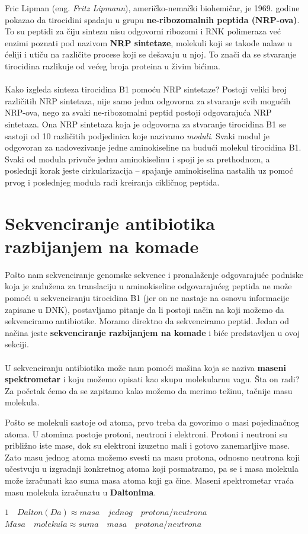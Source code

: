 Fric Lipman (eng. \textit{Fritz Lipmann}), američko-nemački biohemičar, je 1969. godine  pokazao da tirocidini spadaju u grupu \textbf{ne-ribozomalnih peptida (NRP-ova)}. To su peptidi za čiju sintezu nisu odgovorni ribozomi i RNK polimeraza već enzimi poznati pod nazivom \textbf{NRP sintetaze}, molekuli koji se takođe nalaze u ćeliji i utiču na različite procese koji se dešavaju u njoj. To znači da se stvaranje tirocidina razlikuje od većeg broja proteina u živim bićima. 
\\\\
\indent Kako izgleda sinteza tirocidina B1 pomoću NRP sintetaze? Postoji veliki broj različitih NRP sintetaza, nije samo jedna odgovorna za stvaranje svih mogućih NRP-ova, nego za svaki ne-ribozomalni peptid postoji odgovarajuća NRP sintetaza. Ona NRP sintetaza koja je odgovorna za stvaranje tirocidina B1 se sastoji od 10 različitih podjedinica koje nazivamo \textit{moduli}. Svaki modul je odgovoran za nadovezivanje jedne aminokiseline na budući molekul tirocidina B1. Svaki od modula privuče jednu aminokiselinu i spoji je sa prethodnom, a poslednji korak jeste cirkularizacija -- spajanje aminokiselina nastalih uz pomoć prvog i poslednjeg modula radi kreiranja cikličnog peptida.

\section{Sekvenciranje antibiotika razbijanjem na komade} \label{razbijanje}

Pošto nam sekvenciranje genomske sekvence i pronalaženje odgovarajuće podniske koja je zadužena za translaciju u aminokiseline odgovarajućeg peptida ne može pomoći u sekvenciranju tirocidina B1 (jer on ne nastaje na osnovu informacije zapisane u DNK), postavljamo pitanje da li postoji način na koji možemo da sekvenciramo antibiotike. Moramo direktno da sekvenciramo peptid. Jedan od načina jeste \textbf{sekvenciranje razbijanjem na komade} i biće predstavljen u ovoj sekciji.
\\\\

\indent U sekvenciranju antibiotika može nam pomoći mašina koja se naziva \textbf{maseni spektrometar} i koju možemo opisati kao skupu molekularnu vagu. Šta on radi? Za početak ćemo da se zapitamo kako možemo da merimo težinu, tačnije masu molekula. 

Pošto se molekuli sastoje od atoma, prvo treba da govorimo o masi pojedinačnog atoma. U atomima postoje protoni, neutroni i elektroni. Protoni i neutroni su približno iste mase, dok su elektroni izuzetno mali i gotovo zanemarljive mase. Zato masu jednog atoma možemo svesti na masu protona, odnosno neutrona koji učestvuju u izgradnji konkretnog atoma koji posmatramo, pa se i masa molekula može izračunati kao suma masa atoma koji ga čine. Maseni spektrometar vraća masu molekula izračunatu u \textbf{Daltonima}. 
\begin{center}
$1 \quad Dalton (Da) \approx masa \quad jednog \quad protona/neutrona$ \\
$Masa \quad molekula \approx suma \quad masa \quad protona/neutrona$
\end{center}

